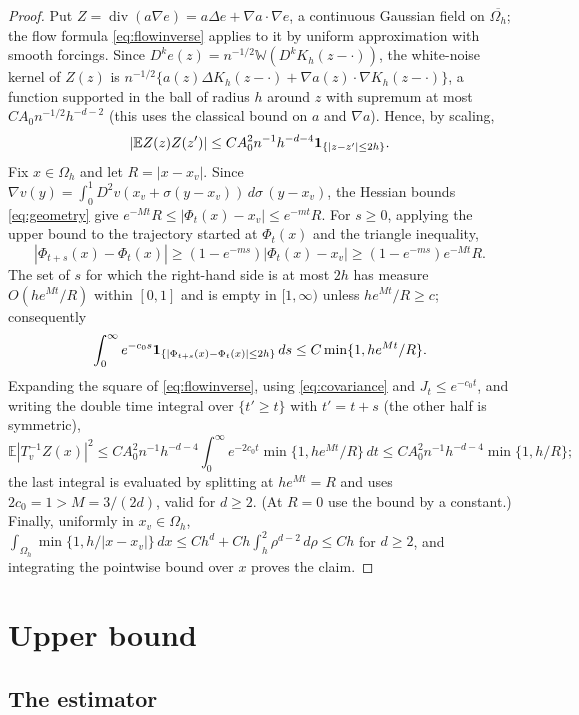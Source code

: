 \documentclass[11pt]{article}
\numberwithin{equation}{section}
\newcommand{\E}{\mathbb E}
\newcommand{\diver}{\operatorname{div}}
\begin{document}
\begin{proof}
Put $Z=\diver(a\nabla e)=a\Delta e+\nabla a\cdot\nabla e$, a continuous
Gaussian field on $\overline{\Omega_h}$; the flow formula
\eqref{eq:flowinverse} applies to it by uniform approximation with
smooth forcings. Since $D^ke(z)=n^{-1/2}\mathbb W(D^kK_h(z-\cdot))$,
the white-noise kernel of $Z(z)$ is
$n^{-1/2}\{a(z)\Delta K_h(z-\cdot)+\nabla a(z)\cdot\nabla K_h(z-\cdot)\}$,
a function supported in the ball of radius $h$ around $z$ with supremum
at most $CA_0n^{-1/2}h^{-d-2}$ (this uses the classical bound on $a$
and $\nabla a$). Hence, by scaling,
\begin{equation}\label{eq:covariance}
 |\E Z(z)Z(z')|
 \le C A_0^2 n^{-1}h^{-d-4}{\bf1}_{\{|z-z'|\le2h\}} .
\end{equation}
Fix $x\in\Omega_h$ and let $R=|x-x_v|$. Since
$\nabla v(y)=\int_0^1D^2v(x_v+\sigma(y-x_v))\,d\sigma\,(y-x_v)$, the
Hessian bounds \eqref{eq:geometry} give
$e^{-Mt}R\le|\Phi_t(x)-x_v|\le e^{-mt}R$. For $s\ge0$, applying the
upper bound to the trajectory started at $\Phi_t(x)$ and the triangle
inequality,
\[
 |\Phi_{t+s}(x)-\Phi_t(x)|
 \ge (1-e^{-ms})|\Phi_t(x)-x_v|
 \ge (1-e^{-ms})e^{-Mt}R.
\]
The set of $s$ for which the right-hand side is at most $2h$ has
measure $O(he^{Mt}/R)$ within $[0,1]$ and is empty in $[1,\infty)$
unless $he^{Mt}/R\ge c$; consequently
\[
 \int_0^\infty e^{-c_0s}
 {\bf1}_{\{|\Phi_{t+s}(x)-\Phi_t(x)|\le2h\}}\,ds
 \le C\min\{1,he^{Mt}/R\}.
\]
Expanding the square of \eqref{eq:flowinverse}, using
\eqref{eq:covariance} and $J_t\le e^{-c_0t}$, and writing the double
time integral over $\{t'\ge t\}$ with $t'=t+s$ (the other half is
symmetric),
\[
 \E|T_v^{-1}Z(x)|^2
 \le CA_0^2n^{-1}h^{-d-4}
 \int_0^\infty e^{-2c_0t}\min\{1,he^{Mt}/R\}\,dt
 \le CA_0^2n^{-1}h^{-d-4}\min\{1,h/R\};
\]
the last integral is evaluated by splitting at $he^{Mt}=R$ and uses
$2c_0=1>M=3/(2d)$, valid for $d\ge2$. (At $R=0$ use the bound by a
constant.) Finally, uniformly in $x_v\in\Omega_h$,
$\int_{\Omega_h}\min\{1,h/|x-x_v|\}\,dx
 \le Ch^d+Ch\int_h^2\rho^{d-2}\,d\rho\le Ch$ for $d\ge2$, and
integrating the pointwise bound over $x$ proves the claim.
\end{proof}

\section{Upper bound}\label{sec:upper}

\subsection{The estimator}\label{sec:estimator}
\end{document}
